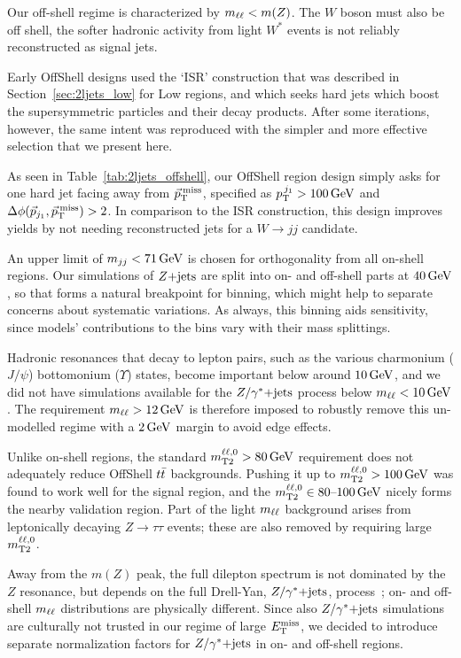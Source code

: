 Our off-shell regime is characterized by $\mll < m(Z)$.
The $W$ boson must also be off shell, the softer hadronic activity from
light $W^*$ events is not reliably reconstructed as signal jets.

Early OffShell designs used the `ISR' construction that was described in
Section~\ref{sec:2ljets_low} for Low regions,
and which seeks hard jets which boost the supersymmetric particles and their
decay products.
After some iterations, however, the same intent was reproduced with the simpler
and more effective selection that we present here.

As seen in Table~\ref{tab:2ljets_offshell}, our OffShell region design
simply asks for one hard jet facing away from $\ptmiss$, specified as
$\ptjone > 100\,\eV[G]$ and $\dphijmet > 2$.
In comparison to the ISR construction, this design improves yields by not
needing reconstructed jets for a $W\to jj$ candidate.

An upper limit of $\mjj < 71\,\eV[G]$ is chosen for orthogonality from all
on-shell regions.
Our simulations of $\zjets$ are split into on- and off-shell parts at
$40\,\eV[G]$, so that forms a natural breakpoint for binning, which might help
to separate concerns about systematic variations.
As always, this binning aids sensitivity, since models' contributions to the
bins vary with their mass splittings.

Hadronic resonances that decay to lepton pairs,
such as the various charmonium ($J/\psi$) bottomonium ($\Upsilon$) states,
become important below around $10\,\eV[G]$, and we did not have simulations
available for the $\zyjets$ process below $\mll < 10\,\eV[G]$.
The requirement $\mll > 12\,\eV[G]$ is therefore imposed to robustly remove
this un-modelled regime with a $2\,\eV[G]$ margin to avoid edge effects.

Unlike on-shell regions, the standard $\mttwoll > 80\,\eV[G]$ requirement does
not adequately reduce OffShell $\ttbar$ backgrounds.
Pushing it up to $\mttwoll > 100\,\eV[G]$ was found to work well for the signal
region, and the $\mttwoll \in 80\textrm{--}100\,\eV[G]$ nicely forms the
nearby validation region.
Part of the light $\mll$ background arises from leptonically decaying
$Z\to \tau\tau$ events; these are also removed by requiring large
$\mttwoll$.

Away from the $m(Z)$ peak, the full dilepton spectrum is not dominated by the
$Z$ resonance, but depends on the full Drell-Yan, $\zyjets$,
process~\cite{drell1970massive};
on- and off-shell $\mll$ distributions are physically different.
Since also $\zyjets$ simulations are culturally not trusted in our regime of
large $\met$, we decided to introduce separate normalization factors for
$\zyjets$ in on- and off-shell regions.

